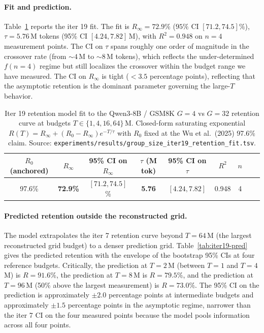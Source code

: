 \paragraph{Fit and prediction.}
Table~\ref{tab:iter19-fit} reports the iter 19 fit.  The fit is
$R_\infty = 72.9\%$ ($95\%$ CI $[71.2, 74.5]\%$),
$\tau = 5.76$\,M tokens (95\% CI $[4.24, 7.82]$\,M), with
$R^2 = 0.948$ on $n{=}4$ measurement points.  The CI on $\tau$
spans roughly one order of magnitude in the crossover rate (from
$\sim\!4$\,M to $\sim\!8$\,M tokens), which reflects the under-determined
$f(n{=}4)$ regime but still localizes the crossover within the
budget range we have measured.  The CI on $R_\infty$ is tight
($< 3.5$ percentage points), reflecting that the
asymptotic retention is the dominant parameter governing the
large-$T$ behavior.

\begin{table}[htbp]
\centering
\small
\begin{tabular}{ccccccccc}
\toprule
$R_0$ (anchored) & $R_\infty$ & 95\% CI on $R_\infty$ & $\tau$ (M tok) & 95\% CI on $\tau$ & $R^2$ & $n$ \\
\midrule
97.6\% & \textbf{72.9\%} & $[71.2, 74.5]$\% & \textbf{5.76} & $[4.24, 7.82]$ & 0.948 & 4 \\
\bottomrule
\end{tabular}
\caption{Iter 19 retention model fit to the Qwen3-8B / GSM8K
$G{=}4$ vs $G{=}32$ retention curve at budgets
$T \in \{1, 4, 16, 64\}$\,M.  Closed-form saturating exponential
$R(T) = R_\infty + (R_0 - R_\infty) e^{-T/\tau}$ with $R_0$ fixed
at the Wu et al.\ (2025) 97.6\% claim.  Source:
\texttt{experiments/results/group\_size\_iter19\_retention\_fit.tsv}.}
\label{tab:iter19-fit}
\end{table}

\paragraph{Predicted retention outside the reconstructed grid.}
The model extrapolates the iter 7 retention curve beyond
$T{=}64$\,M (the largest reconstructed grid budget) to a denser prediction grid.
Table~\ref{tab:iter19-pred} gives the predicted retention with the
envelope of the bootstrap 95\% CIs at four reference budgets.
Critically, the prediction at $T{=}2$\,M (between $T{=}1$ and $T{=}4$\,M)
is $R = 91.6\%$, the prediction at $T{=}8$\,M is $R = 79.5\%$, and
the prediction at $T{=}96$\,M (50\% above the largest measurement)
is $R = 73.0\%$.  The 95\% CI on the prediction is approximately
$\pm 2.0$ percentage points at intermediate budgets and approximately
$\pm 1.5$ percentage points in the asymptotic regime, narrower than
the iter 7 CI on the four measured points because the model pools
information across all four points.

